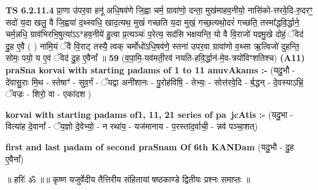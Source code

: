 \documentclass[17pt]{extarticle}
\begin{document}
                  \newline
                                \textbf{ TS 6.2.11.4} \newline
                  प्रा॒णा उ॑पर॒वा हनू॑ अधि॒षव॑णे जि॒ह्वा चर्म॒ ग्रावा॑णो॒ दन्ता॒ मुख॑माहव॒नीयो॒ नासि॑को-त्तरवे॒दि-रु॒दरꣳ॒॒ सदो॑ य॒दा खलु॒ वै जि॒ह्वया॑ द॒थ्स्वधि॒ खाद॒त्यथ॒ मुखं॑ गच्छति य॒दा मुखं॒ गच्छ॒त्यथो॒दरं॑ गच्छति॒ तस्मा᳚द्धवि॒र्द्धाने॒ चर्म॒न्नधि॒ ग्राव॑भिरभि॒षुत्या॑ऽऽ*हव॒नीये॑ हु॒त्वा प्र॒त्यञ्चः॑ प॒रेत्य॒ सद॑सि भक्षयन्ति॒ यो वै वि॒राजो॑ यज्ञ्मु॒खे दोहं॒ ॅवेद॑ दु॒ह ए॒वै ( ) ना॑मि॒यं ॅवै वि॒राट् तस्यै॒ त्वक् चर्मोधो॑ऽधि॒षव॑णे॒ स्तना॑ उपर॒वा ग्रावा॑णो व॒थ्सा ऋ॒त्विजो॑ दुहन्ति॒ सोमः॒ पयो॒ य ए॒वं ॅवेद॑ दु॒ह ए॒वैनां᳚ ॥ \textbf{  59} \newline
                  \newline
                      (व॒पा॒मि॒-यव॑मती॒रव॑ नयति-हवि॒र्द्धान॑-मे॒व-त्रयो॑विꣳशतिश्च)  \textbf{(A11)} \newline \newline
                \textbf{praSna korvai with starting padams of 1 to 11 anuvAkams :-} \newline
        (यदु॒भौ - दे॑वासु॒राः मि॒थ - स्तेषाꣳ॑ - सुव॒र्गं - ॅयद्वा अनी॑शानः - पु॒रोह॑विषि॒ - तेभ्यः॒ - सोत्त॑रवे॒दि - र्ब॒द्धन् - दे॒वस्याऽभ्रिं॒ ॅवज्रः - शिरो॒ वा - एका॑दश ) \newline

        \textbf{korvai with starting padams of1, 11, 21 series of pa~jcAtis :-} \newline
        (यदु॒भा - वित्या॑ह दे॒वानां᳚ - ॅय॒ज्ञो दे॒वेभ्यो॒ - न रथा॑य॒ - यज॑मानाय - प॒रस्ता॑द॒र्वाची॒ - न्नव॑ पञ्चा॒शत्) \newline

        \textbf{first and last padam of second praSnam Of 6th KANDam} \newline
        (यदु॒भौ - दु॒ह ए॒वैनां᳚) \newline 

        
        ॥ हरिः॑ ॐ ॥॥ कृष्ण यजुर्वेदीय तैत्तिरीय संहितायां षष्ठकाण्डे द्वितीयः प्रश्नः समाप्तः ॥ \newline
        \pagebreak
                \pagebreak
        
\end{document}
